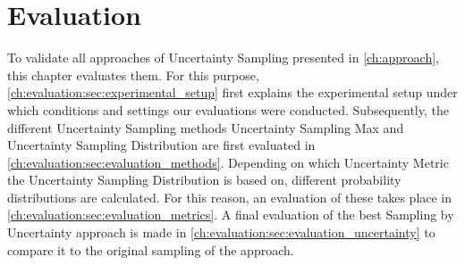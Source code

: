 \chapter{Evaluation}
\label{ch:evaluation}

To validate all approaches of Uncertainty Sampling presented in \autoref{ch:approach}, this chapter evaluates them.
For this purpose, \autoref{ch:evaluation:sec:experimental_setup} first explains the experimental setup under which conditions and settings our evaluations were conducted.
Subsequently, the different Uncertainty Sampling methods Uncertainty Sampling Max and Uncertainty Sampling Distribution are first evaluated in \autoref{ch:evaluation:sec:evaluation_methods}.
Depending on which Uncertainty Metric the Uncertainty Sampling Distribution is based on, different probability distributions are calculated.
For this reason, an evaluation of these takes place in \autoref{ch:evaluation:sec:evaluation_metrics}.
A final evaluation of the best Sampling by Uncertainty approach is made in \autoref{ch:evaluation:sec:evaluation_uncertainty} to compare it to the original sampling of the \kbgan approach.



\newpage



\newpage



\newpage


